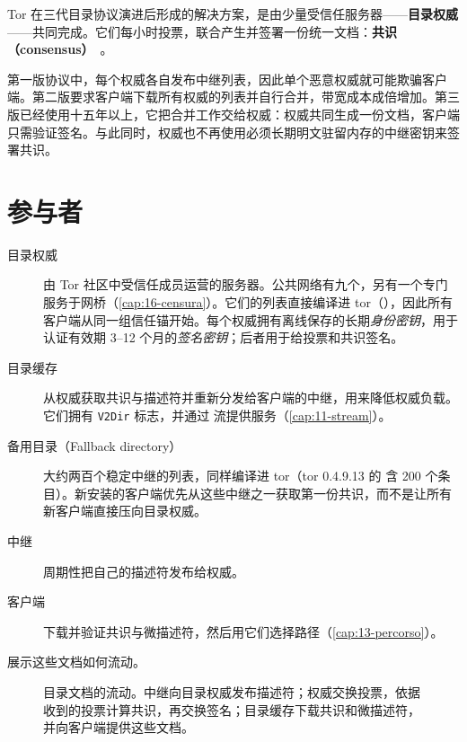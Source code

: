 Tor 在三代目录协议演进后形成的解决方案，是由少量受信任服务器——\textbf{目录权威}——共同完成。它们每小时投票，联合产生并签署一份统一文档：\textbf{共识（consensus）}~。

\begin{storia}[三代目录协议]
第一版协议中，每个权威各自发布中继列表，因此单个恶意权威就可能欺骗客户端。第二版要求客户端下载所有权威的列表并自行合并，带宽成本成倍增加。第三版已经使用十五年以上，它把合并工作交给权威：权威共同生成一份文档，客户端只需验证签名。与此同时，权威也不再使用必须长期明文驻留内存的中继密钥来签署共识。
\end{storia}

\section{参与者}\label{sec:dir-attori}

\begin{description}
  \item[目录权威] 由 Tor 社区中受信任成员运营的服务器。公共网络有九个，另有一个专门服务于网桥（\cref{cap:16-censura}）。它们的列表直接编译进 tor（），因此所有客户端从同一组信任锚开始。每个权威拥有离线保存的长期\emph{身份密钥}，用于认证有效期 3--12 个月的\emph{签名密钥}；后者用于给投票和共识签名。
  \item[目录缓存] 从权威获取共识与描述符并重新分发给客户端的中继，用来降低权威负载。它们拥有 \texttt{V2Dir} 标志，并通过  流提供服务（\cref{cap:11-stream}）。
  \item[备用目录（Fallback directory）] 大约两百个稳定中继的列表，同样编译进 tor（tor 0.4.9.13 的  含 200 个条目）。新安装的客户端优先从这些中继之一获取第一份共识，而不是让所有新客户端直接压向目录权威。
  \item[中继] 周期性把自己的描述符发布给权威。
  \item[客户端] 下载并验证共识与微描述符，然后用它们选择路径（\cref{cap:13-percorso}）。
\end{description}

 展示这些文档如何流动。

\begin{figure}[htbp]
\centering

\caption{目录文档的流动。中继向目录权威发布描述符；权威交换投票，依据收到的投票计算共识，再交换签名；目录缓存下载共识和微描述符，并向客户端提供这些文档。}
\label{fig:dir-flusso}
\end{figure}

